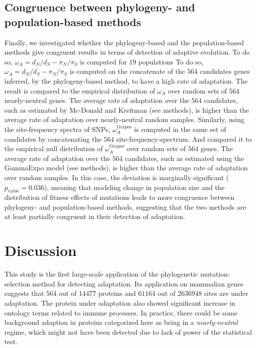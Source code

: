 \documentclass{article}
\newcommand{\dn}{d_N}
\newcommand{\ds}{d_S}
\newcommand{\dnds}{\dn / \ds}
\newcommand{\pn}{\pi_N}
\newcommand{\ps}{\pi_S}
\newcommand{\pnps}{\pn / \ps}
\begin{document}
\subsection*{Congruence between phylogeny- and population-based methods}
Finally, we investigated whether the phylogeny-based and the population-based methods give congruent results in terms of detection of adaptive evolution.
To do so, $\omega_A=\dnds - \pnps$ is computed for $19$ populations
To do so, $\omega_A=\dnds - \pnps$ is computed on the concatenate of the $564$ candidates genes inferred, by the phylogeny-based method, to have a high rate of adaptation.
The result is compared to the empirical distribution of $\omega_A$ over random sets of $564$ nearly-neutral genes.
The average rate of adaptation over the $564$ candidates, such as estimated by Mc-Donald and Kreitman (see methods), is higher than the average rate of adaptation over nearly-neutral random samples.
Similarly, using the site-frequency spectra of SNPs, $\omega_A^{\text{Grapes}}$ is computed in the same set of candidates by concatenating the $564$ site-frequency-spectrum.
And compared it to the empirical null distribution of $\omega_A^{\text{Grapes}}$ over random sets of $564$ genes.
The average rate of adaptation over the $564$ candidates, such as estimated using the GammaExpo model (see methods), is higher than the average rate of adaptation over random samples.
In this case, the deviation is marginally significant ($p_{\mathrm{value}}=0.036$),
meaning that modeling change in population size and the distribution of fitness effects of mutations leads to more congruence between phylogeny- and population-based methods, suggesting that the two methods are at least partially congruent in their detection of adaptation.

\section*{Discussion}

This study is the first large-scale application of the phylogenetic mutation-selection method for detecting adaptation.
Its application on mammalian genes suggests that $564$ out of $14477$ proteins and $61164$ out of $2636948$ sites are under adaptation.
The protein under adaptation also showed significant increase in ontology terms related to immune processes.
In practice, there could be some background adaption in proteins categorized here as being in a \textit{nearly-neutral} regime, which might not have been detected due to lack of power of the statistical test.
\end{document}
